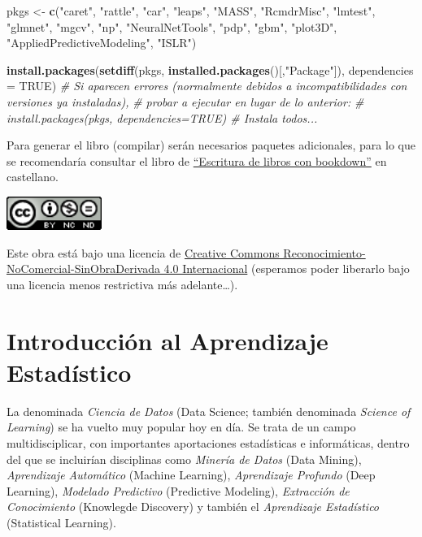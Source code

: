 \documentclass[
]{book}
\newenvironment{Shaded}{\begin{snugshade}}{\end{snugshade}}
\newcommand{\CommentTok}[1]{\textcolor[rgb]{0.56,0.35,0.01}{\textit{#1}}}
\newcommand{\DataTypeTok}[1]{\textcolor[rgb]{0.13,0.29,0.53}{#1}}
\newcommand{\KeywordTok}[1]{\textcolor[rgb]{0.13,0.29,0.53}{\textbf{#1}}}
\newcommand{\NormalTok}[1]{#1}
\newcommand{\OtherTok}[1]{\textcolor[rgb]{0.56,0.35,0.01}{#1}}
\newcommand{\StringTok}[1]{\textcolor[rgb]{0.31,0.60,0.02}{#1}}
\theoremstyle{break}
\theoremstyle{definition}
\theoremstyle{definition}
\theoremstyle{definition}
\theoremstyle{remark}
\begin{document}
\begin{Shaded}
\begin{Highlighting}[]
\NormalTok{pkgs <-}\StringTok{ }\KeywordTok{c}\NormalTok{(}\StringTok{"caret"}\NormalTok{, }\StringTok{"rattle"}\NormalTok{, }\StringTok{"car"}\NormalTok{, }\StringTok{"leaps"}\NormalTok{, }\StringTok{"MASS"}\NormalTok{, }\StringTok{"RcmdrMisc"}\NormalTok{, }
          \StringTok{"lmtest"}\NormalTok{, }\StringTok{"glmnet"}\NormalTok{, }\StringTok{"mgcv"}\NormalTok{, }\StringTok{"np"}\NormalTok{, }\StringTok{"NeuralNetTools"}\NormalTok{, }\StringTok{"pdp"}\NormalTok{, }
          \StringTok{"gbm"}\NormalTok{, }\StringTok{"plot3D"}\NormalTok{,}
          \StringTok{"AppliedPredictiveModeling"}\NormalTok{, }\StringTok{"ISLR"}\NormalTok{)}

\KeywordTok{install.packages}\NormalTok{(}\KeywordTok{setdiff}\NormalTok{(pkgs, }\KeywordTok{installed.packages}\NormalTok{()[,}\StringTok{"Package"}\NormalTok{]), }\DataTypeTok{dependencies =} \OtherTok{TRUE}\NormalTok{)}
\CommentTok{# Si aparecen errores (normalmente debidos a incompatibilidades con versiones ya instaladas), }
\CommentTok{# probar a ejecutar en lugar de lo anterior:}
\CommentTok{# install.packages(pkgs, dependencies=TRUE) # Instala todos...}
\end{Highlighting}
\end{Shaded}

Para generar el libro (compilar) serán necesarios paquetes adicionales,
para lo que se recomendaría consultar el libro de \href{https://rubenfcasal.github.io/bookdown_intro}{``Escritura de libros con bookdown''} en castellano.

\includegraphics[width=1.22in]{images/by-nc-nd-88x31}

Este obra está bajo una licencia de \href{https://creativecommons.org/licenses/by-nc-nd/4.0/deed.es_ES}{Creative Commons Reconocimiento-NoComercial-SinObraDerivada 4.0 Internacional}
(esperamos poder liberarlo bajo una licencia menos restrictiva más adelante\ldots).

\hypertarget{intro-AE}{%
\chapter{Introducción al Aprendizaje Estadístico}\label{intro-AE}}

La denominada \emph{Ciencia de Datos} (Data Science; también denominada \emph{Science of Learning}) se ha vuelto muy popular hoy en día.
Se trata de un campo multidisciplicar, con importantes aportaciones estadísticas e informáticas, dentro del que se incluirían disciplinas como \emph{Minería de Datos} (Data Mining), \emph{Aprendizaje Automático} (Machine Learning), \emph{Aprendizaje Profundo} (Deep Learning), \emph{Modelado Predictivo} (Predictive Modeling), \emph{Extracción de Conocimiento} (Knowlegde Discovery) y también el \emph{Aprendizaje Estadístico} (Statistical Learning).
\end{document}
